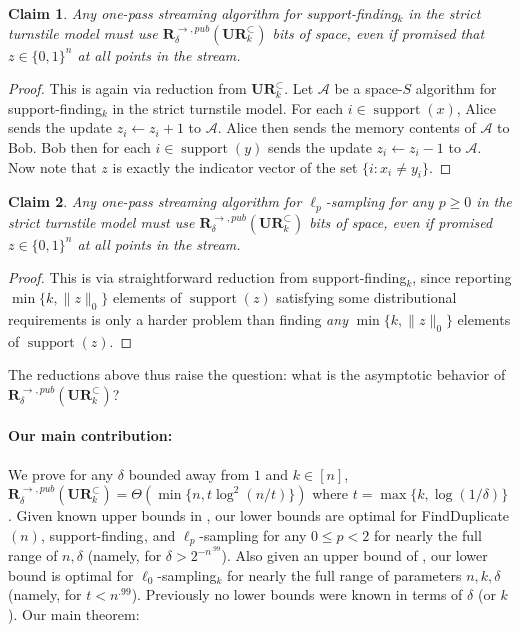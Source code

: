 \documentclass[11pt]{article}
\newcommand{\supp}{\mathop{support}}
\newcommand{\suppfind}[1]{support-finding$_{{#1}}$}
\newtheorem{claim}{Claim}
\newcommand{\ur}{\mathbf{UR}\xspace}
\newcommand{\randcom}{\mathbf{R}}
\newcommand{\findup}[1]{\textsf{FindDuplicate}$({#1})$\xspace}
\begin{document}
\begin{claim}
Any one-pass streaming algorithm for \suppfind{k} in the strict turnstile model must use $\randcom^{\rightarrow,pub}_{\delta}(\ur_k^\subset)$ bits of space, even if promised that $z\in\{0,1\}^n$ at all points in the stream.
\end{claim}
\begin{proof}
This is again via reduction from $\ur_k^\subset$. Let $\mathcal{A}$ be a space-$S$ algorithm for \suppfind{k} in the strict turnstile model. For each $i\in\supp(x)$, Alice sends the update $z_i \leftarrow z_i + 1$ to $\mathcal{A}$. Alice then sends the memory contents of $\mathcal{A}$ to Bob. Bob then for each $i\in\supp(y)$ sends the update $z_i\leftarrow z_i - 1$ to $\mathcal{A}$. Now note that $z$ is exactly the indicator vector of the set $\{i : x_i\neq y_i\}$.
\end{proof}

\begin{claim}
Any one-pass streaming algorithm for $\ell_p$-sampling for any $p\ge 0$ in the strict turnstile model must use $\randcom^{\rightarrow,pub}_{\delta}(\ur_k^\subset)$ bits of space, even if promised $z\in\{0,1\}^n$ at all points in the stream.
\end{claim}
\begin{proof}
This is via straightforward reduction from \suppfind{k}, since reporting $\min\{k,\|z\|_0\}$ elements of $\supp(z)$ satisfying some distributional requirements is only a harder problem than finding {\em any} $\min\{k,\|z\|_0\}$ elements of $\supp(z)$.
\end{proof}

The reductions above thus raise the question: what is the asymptotic behavior of $\randcom^{\rightarrow,pub}_\delta(\ur_k^\subset)$?

\paragraph{Our main contribution:} We prove for any $\delta$ bounded away from $1$ and $k\in[n]$, $\randcom^{\rightarrow,pub}_\delta(\ur_k^\subset) = \Theta(\min\{n, t\log^2(n/t)\})$ where $t = \max\{k,\log(1/\delta)\}$. Given known upper bounds in \cite{JowhariST11}, our lower bounds are optimal for \findup{n}, \suppfind{}, and $\ell_p$-sampling for any $0\le p<2$ for nearly the full range of $n, \delta$ (namely, for $\delta > 2^{-n^{.99}}$). Also given an upper bound of \cite{JowhariST11}, our lower bound is optimal for $\ell_0$-sampling$_k$ for nearly the full range of parameters $n, k, \delta$ (namely, for $t < n^{.99}$). Previously no lower bounds were known in terms of $\delta$ (or $k$). Our main theorem:
\end{document}
